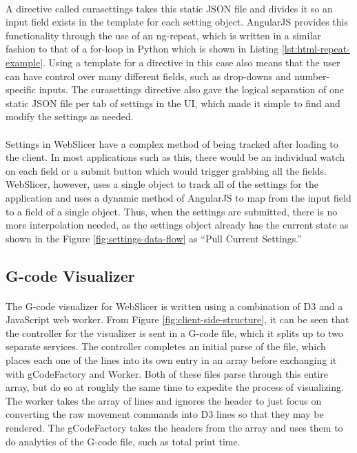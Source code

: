 \paragraph{}
A directive called curasettings takes this static JSON file and divides it so an input field exists in the template for each setting object.
AngularJS provides this functionality through the use of an ng-repeat, which is written in a similar fashion to that of a for-loop in Python which is shown in Listing \ref{lst:html-repeat-example}.
Using a template for a directive in this case also means that the user can have control over many different fields, such as drop-downs and number-specific inputs.
The curasettings directive also gave the logical separation of one static JSON file per tab of settings in the UI, which made it simple to find and modify the settings as needed.

\paragraph{}
Settings in WebSlicer have a complex method of being tracked after loading to the client.
In most applications such as this, there would be an individual watch on each field or a submit button which would trigger grabbing all the fields.
WebSlicer, however, uses a single object to track all of the settings for the application and uses a dynamic method of AngularJS to map from the input field to a field of a single object.
Thus, when the settings are submitted, there is no more interpolation needed, as the settings object already has the current state as shown in the Figure \ref{fig:settings-data-flow} as ``Pull Current Settings.''

\subsection{G-code Visualizer}
\paragraph{}
The G-code visualizer for WebSlicer is written using a combination of D3 and a JavaScript web worker.
From Figure \ref{fig:client-side-structure}, it can be seen that the controller for the visualizer is sent in a G-code file, which it splits up to two separate services.
The controller completes an initial parse of the file, which places each one of the lines into its own entry in an array before exchanging it with gCodeFactory and Worker.
Both of these files parse through this entire array, but do so at roughly the same time to expedite the process of visualizing.
The worker takes the array of lines and ignores the header to just focus on converting the raw movement commands into D3 lines so that they may be rendered.
The gCodeFactory takes the headers from the array and uses them to do analytics of the G-code file, such as total print time.

